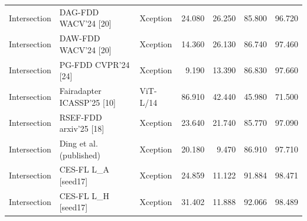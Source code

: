 \begin{table}[t]
{\begin{tabular}{lllrrrr}
Intersection & DAG-FDD WACV’24 [20] & Xception & 24.080 & 26.250 & 85.800 & 96.720 \\
Intersection & DAW-FDD WACV’24 [20] & Xception & 14.360 & 26.130 & 86.740 & 97.460 \\
Intersection & PG-FDD CVPR’24 [24] & Xception & 9.190 & 13.390 & 86.830 & 97.660 \\
Intersection & Fairadapter ICASSP’25 [10] & ViT-L/14 & 86.910 & 42.440 & 45.980 & 71.500 \\
Intersection & RSEF-FDD arxiv’25 [18] & Xception & 23.640 & 21.740 & 85.770 & 97.090 \\
Intersection & Ding et al. (published) & Xception & 20.180 & 9.470 & 86.910 & 97.710 \\
Intersection & CES-FL L\_A [seed17] & Xception & 24.859 & 11.122 & 91.884 & 98.471 \\
Intersection & CES-FL L\_H [seed17] & Xception & 31.402 & 11.888 & 92.066 & 98.489 \\
\bottomrule
\end{tabular}}
\end{table}


